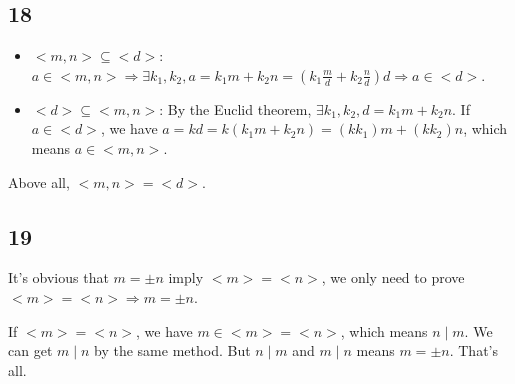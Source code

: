 \documentclass{article}
\begin{document}
		\subsection*{18}

		\begin{itemize}
			\item $<m,n> \subseteq <d>$: $a \in <m,n> \Rightarrow \exists k_1, k_2, a
				= k_1m+k_2n = (k_1\frac{m}{d} + k_2\frac{n}{d})d \Rightarrow a \in <d>$.
		  \item $<d> \subseteq <m,n>$: By the Euclid theorem, $\exists k_1, k_2, d =
				k_1m+k_2n$. If $a \in <d>$, we have $a = kd = k(k_1m + k_2n) = (kk_1)m +
				(kk_2)n$, which means $a \in <m,n>$.
		\end{itemize}
		
		Above all, $<m,n> = <d>$.

		\subsection*{19}

		It's obvious that $m = \pm n$ imply $<m> = <n>$, we only need to prove $<m>
		= <n> \Rightarrow m = \pm n$.

		If $<m> = <n>$, we have $m \in <m> = <n>$, which means $n \mid m$. We can
		get $m \mid n$ by the same method. But $n \mid m$ and $m \mid n$ means $m =
		\pm n$. That's all.
\end{document}
